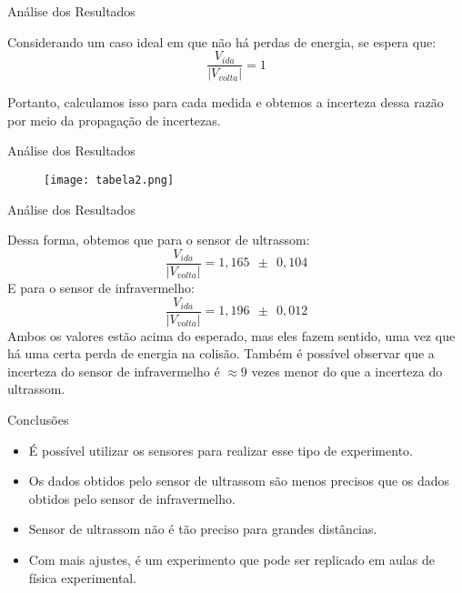\documentclass{beamer}
\begin{document}
\begin{frame}{Análise dos Resultados}

    Considerando um caso ideal em que não há perdas de energia, se espera que:
    $$\dfrac{V_{ida}}{\vert V_{volta}\vert} = 1$$

    Portanto, calculamos isso para cada medida e obtemos a incerteza dessa razão por meio da propagação de incertezas.
    
\end{frame}

\begin{frame}{Análise dos Resultados}
    
     \begin{figure}
  \texttt{[image: tabela2.png]}
\end{figure}
    
\end{frame}

\begin{frame}{Análise dos Resultados}

    Dessa forma, obtemos que para o sensor de ultrassom:
    $$\dfrac{V_{ida}}{\vert V_{volta}\vert} = 1,165~~\pm~~ 0,104$$
    E para o sensor de infravermelho:
    $$\dfrac{V_{ida}}{\vert V_{volta}\vert} = 1,196~~\pm~~ 0,012$$
    Ambos os valores estão acima do esperado, mas eles fazem sentido, uma vez que há uma certa perda de energia na colisão. Também é possível observar que a incerteza do sensor de infravermelho é $\approx 9$ vezes menor do que a incerteza do ultrassom.
    
\end{frame}

\begin{frame}{Conclusões}

    \begin{itemize}
        \item É possível utilizar os sensores para realizar esse tipo de experimento. 
        \item Os dados obtidos pelo sensor de ultrassom são menos precisos que os dados obtidos pelo sensor de infravermelho.
        \item Sensor de ultrassom não é tão preciso para grandes distâncias.
        \item Com mais ajustes, é um experimento que pode ser replicado em aulas de física experimental. 
    \end{itemize}
    
\end{frame}
\end{document}
